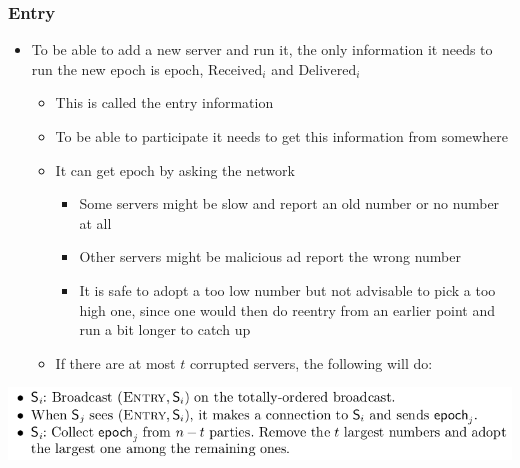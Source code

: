 \documentclass[11pt]{article}
\begin{document}
\subsubsection{Entry}
\label{sec:orge05bb32}
\begin{itemize}
\item To be able to add a new server and run it, the only information it needs to run the new epoch is \(\text{epoch}\), \(\text{Received}_i\) and \(\text{Delivered}_i\)
\begin{itemize}
\item This is called the entry information
\item To be able to participate it needs to get this information from somewhere
\item It can get \(\text{epoch}\) by asking the network
\begin{itemize}
\item Some servers might be slow and report an old number or no number at all
\item Other servers might be malicious ad report the wrong number
\item It is safe to adopt a too low number but not advisable to pick a too high one, since one would then do reentry from an earlier point and run a bit longer to catch up
\end{itemize}
\item If there are at most \(t\) corrupted servers, the following will do:
\end{itemize}
\end{itemize}
\begin{center}
\includegraphics[width=.9\linewidth]{State Machine Replication (10)/screenshot_2018-10-21_17-07-04.png}
\end{center}
\end{document}
